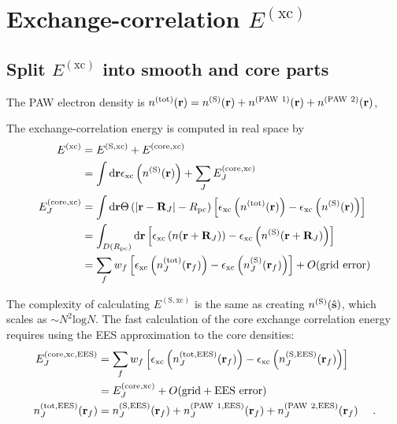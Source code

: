 \documentclass[paper=a4, fontsize=11pt]{article} %
\numberwithin{equation}{section} %
\numberwithin{figure}{section} %
\numberwithin{table}{section} %
\newcommand{\bs}{{\bf{s}}}
\newcommand{\br}{{\bf{r}}}
\newcommand{\bR}{{\bf{R}}}
\newcommand{\rS}{{\mathrm{S}}}
\newcommand{\rEES}{{\mathrm{EES}}}
\newcommand{\rxc}{{\mathrm{xc}}}
\newcommand{\rcore}{{\mathrm{core}}}
\newcommand{\rP}{{\mathrm{PAW}}}
\newcommand{\rd}{{\mathrm{d}}}
\newcommand{\rl}{{\mathrm{log}}}
\newcommand{\rtot}{{\mathrm{tot}}}
\newcommand{\Rpc}{{R_{\mathrm{pc}}}}
\begin{document}
\newpage
\section{Exchange-correlation $E^{(\rxc)}$}
\subsection{Split $E^{(\rxc)}$ into smooth and core parts}
The PAW electron density is $n^{(\rtot)}(\br) = n^{(\rS)}(\br) + n^{(\rP\ 1)}(\br) + n^{(\rP\ 2)}(\br)$,

The exchange-correlation energy is computed in real space by
\begin{equation}
\begin{split}
E^{(\rxc)} 
&= E^{(\rS,\rxc)} + E^{(\rcore,\rxc)}\\
&= \int \rd\br \epsilon_{\rxc}\left(n^{(\rS)}(\br)\right) + \sum_J E_J^{(\rcore,\rxc)} \\
E_J^{(\rcore,\rxc)}
&= \int \rd\br \Theta\left(|\br-\bR_J|-\Rpc\right)\left[\epsilon_{\rxc}
\left(n^{(\rtot)}(\br)\right) - \epsilon_{\rxc} \left(n^{(\rS)}(\br)\right)\right] \\
&= \int _{D(\Rpc)} \rd\br \left[\epsilon_{\rxc}
\left(n(\br+\bR_J)\right)-\epsilon_{\rxc}\left(n^{(\rS)}(\br+\bR_J)\right)\right] \\
&= \sum_f w_f \left[\epsilon_{\rxc}
\left(n_J^{(\rtot)}(\br_f)\right)-\epsilon_{\rxc}\left(n_J^{(\rS)}(\br_f)\right)\right] + O({\mathrm{grid}\ \mathrm{error}})
\end{split}
\end{equation}


The complexity of calculating $E^{(\rS,\rxc)}$ is the same as creating $n^{(\rS)}(\hat \bs)$, which scales as $\sim N^2 \rl N$. The fast calculation of the core exchange correlation energy requires using the EES approximation to the core densities:\\
\begin{equation}
\begin{split}
E_J^{(\rcore,\rxc,\rEES)}\label{eq:ExccoreEES}
&= \sum_f w_f \left[\epsilon_{\rxc}
\left(n^{(\rtot,\rEES)}_J(\br_f)\right)-\epsilon_{\rxc}\left(n_J^{(\rS,\rEES)}(\br_f)\right)\right] \\
&= E_J^{(\rcore,\rxc)}+O(\mathrm{grid}+\mathrm{EES\ error}) \\
n^{(\rtot,\rEES)}_J(\br_f)
&= n^{(\rS,\rEES)}_J(\br_f) + n^{(\rP\ 1,\rEES)}_J(\br_f) +n^{(\rP\ 2,\rEES)}_J(\br_f)\ \ \ \ .\\
\end{split}
\end{equation}
\end{document}

